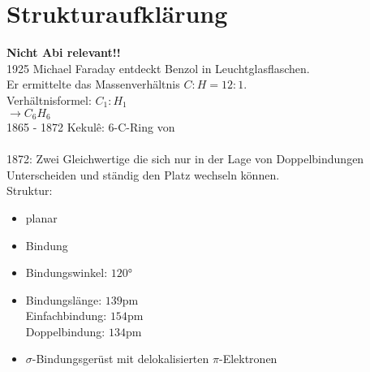 \section{Strukturaufklärung}
\textbf{Nicht Abi relevant!!} \\
1925 Michael Faraday entdeckt Benzol in Leuchtglasflaschen. \\
Er ermittelte das Massenverhältnis $C:H = 12:1$. \\
Verhältnisformel: $C_1:H_1$ \\
$\rightarrow C_6H_6$ \\

1865 - 1872 Kekulê: 6-C-Ring von \\
 \\
1872: Zwei Gleichwertige die sich nur in der Lage von Doppelbindungen Unterscheiden und ständig den Platz wechseln können. \\
Struktur:
\begin{multicols}{2}
\begin{itemize}
    \item planar
    \item Bindung
    \item Bindungswinkel: $120$°
    \item Bindungslänge: $139$pm \\
        Einfachbindung: $154$pm \\
        Doppelbindung: $134$pm
    \item $\sigma$-Bindungsgerüst mit delokalisierten $\pi$-Elektronen
\end{itemize}
\end{multicols}

